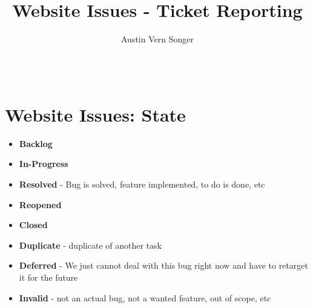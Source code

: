 \documentclass[10pt, oneside, letterpaper]{apa6e}
\title{Website Issues - Ticket Reporting}
\author{
Austin Vern Songer\\%
\\%
\\%
		}
\begin{document}
\section{Website Issues: State}
\begin{itemize}
    \item \textbf{Backlog}
    \item \textbf{In-Progress}
    \item \textbf{Resolved} - Bug is solved, feature implemented, to do is done, etc 
    \item \textbf{Reopened}
    \item \textbf{Closed}
    \item \textbf{Duplicate} - duplicate of another task 
    \item \textbf{Deferred} - We just cannot deal with this bug right now and have to retarget it for the future 
    \item \textbf{Invalid} -  not an actual bug, not a wanted feature, out of scope, etc 
\end{itemize}
\newpage
\end{document}
